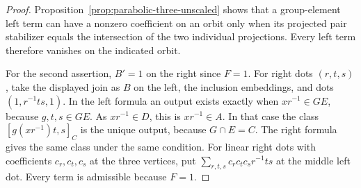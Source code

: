 \documentclass[11pt,a4paper]{article}
\numberwithin{equation}{section}
\theoremstyle{definition}
\begin{document}
\begin{proof}
Proposition~\ref{prop:parabolic-three-unscaled} shows that a
group-element left term can have a nonzero coefficient on an
orbit only when its projected pair stabilizer equals the
intersection of the two individual projections. Every left
term therefore vanishes on the indicated orbit.

For the second assertion, \(B'=1\) on the right since \(F=1\).
For right dots \((r,t,s)\), take the displayed join as \(B\) on
the left, the inclusion embeddings, and dots
\((1,r^{-1}ts,1)\). In the left formula an output exists exactly
when \(xr^{-1}\in GE\), because \(g,t,s\in GE\). As
\(xr^{-1}\in D\), this is \(xr^{-1}\in A\).
In that case the class \([g(xr^{-1})t,s]_C\) is the unique
output, because \(G\cap E=C\). The right formula gives the same class
under the same condition. For linear right dots with coefficients
\(c_r,c_t,c_s\) at the three vertices, put
\(\sum_{r,t,s}c_r c_t c_s r^{-1}ts\) at the middle left dot. Every term is admissible because \(F=1\).
\end{proof}
\end{document}
